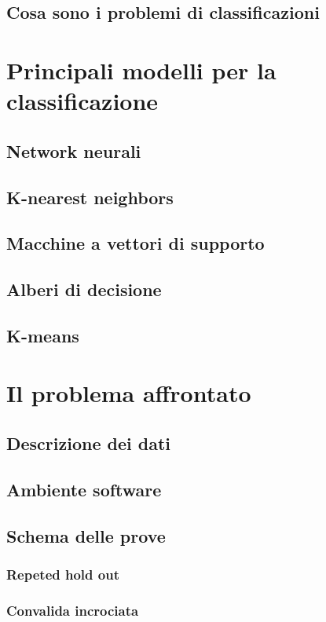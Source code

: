 \documentclass[a4paper,12pt]{report}
\begin{document}
\section{Cosa sono i problemi di classificazioni}

\chapter{Principali modelli per la classificazione}
\section{Network neurali}
\section{K-nearest neighbors}
\section{Macchine a vettori di supporto}
\section{Alberi di decisione}
\section{K-means}

% 
% 
\chapter{Il problema affrontato}
\label{cap2}
\section{Descrizione dei dati}
\section{Ambiente software}
\section{Schema delle prove}
\subsection{Repeted hold out}
\subsection{Convalida incrociata}
\end{document}
